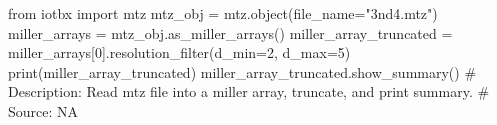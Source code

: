 from iotbx import mtz
mtz_obj = mtz.object(file_name="3nd4.mtz")
miller_arrays = mtz_obj.as_miller_arrays()
miller_array_truncated = miller_arrays[0].resolution_filter(d_min=2, d_max=5)
print(miller_array_truncated)
miller_array_truncated.show_summary()
# Description:  Read mtz file into a miller array, truncate, and print summary.
# Source:  NA


